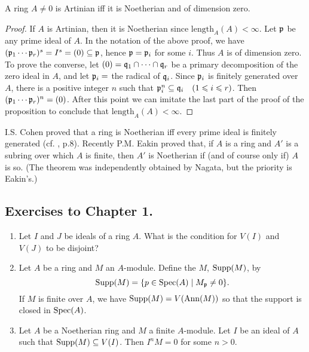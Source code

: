 \documentclass[../main]{subfiles}
\begin{document}
\begin{corollary*}
A ring $A\neq 0$ is Artinian iff it is Noetherian and of dimension zero.
\end{corollary*}
\begin{proof}
If $A$ is Artinian, then it is Noetherian since $\mathrm{length}_A(A)<\infty$. 
Let $\mathfrak{p}$ be any prime ideal of $A$. In the notation of the above proof, we have $(\mathfrak{p}_1\cdots\mathfrak{p}_r)^s=I^s=(0)\subseteq\mathfrak{p}$, hence $\mathfrak{p}=\mathfrak{p}_i$ for some $i$. Thus $A$ is of dimension zero. 
To prove the converse, let $(0)=\mathfrak{q}_1\cap\cdots\cap\mathfrak{q}_r$ be a primary decomposition of the zero ideal in $A$, and let $\mathfrak{p}_i=$ the radical of $\mathfrak{q}_i$. Since $\mathfrak{p}_i$ is finitely generated over $A$, there is a positive integer $n$ such that $\ideal{p}_i^n\subseteq\ideal{q}_i\for{1\leq i\leq r}$. Then $(\mathfrak{p}_1\cdots\mathfrak{p}_r)^n=(0)$. After this point we can imitate the last part of the proof of the proposition to conclude that $\mathrm{length}_A(A)<\infty$.
\end{proof}

\newparagraph
I.S. Cohen proved that a ring is Noetherian iff every prime ideal is finitely generated (cf. \cite{nagata1975local}, p.8). Recently P.M. Eakin \cite{eakin1968the} proved that, if $A$ is a ring and $A'$ is a subring over which $A$ is finite, then $A'$ is Noetherian if (and of course only if) $A$ is so. (The theorem was independently obtained by Nagata, but the priority is Eakin's.)

\subsection*{Exercises to Chapter 1.}
\begin{enumerate}
    \item Let $I$ and $J$ be ideals of a ring $A$. What is the condition for $V(I)$ and $V(J)$ to be disjoint?
    \item Let $A$ be a ring and $M$ an $A$-module. Define the $M$, $\operatorname{Supp}(M)$, by \[\operatorname{Supp}(M)=\{p\in\operatorname{Spec}(A)\mid M_{\mathfrak{p}}\neq 0\}.\] If $M$ is finite over $A$, we have $\operatorname{Supp}(M)=V(\operatorname{Ann}(M))$ so that the support is closed in $\operatorname{Spec}(A)$.
    \item Let $A$ be a Noetherian ring and $M$ a finite $A$-module. Let $I$ be an ideal of $A$ such that $\operatorname{Supp}(M)\subseteq V(I)$. Then $I^nM=0$ for some $n>0$.
\end{enumerate}
\end{document}
